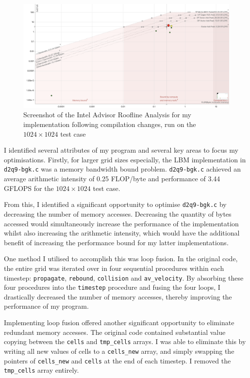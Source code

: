 \documentclass[twocolumn, a4paper]{article}
\begin{document}
\begin{figure}[htbp]
\includegraphics[width=\linewidth]{roofline_compiler.png}
\caption{Screenshot of the Intel Advisor Roofline Analysis for my implementation following compilation changes, run on the $1024\times1024$ test case}\label{fig:roofline_compiler}
\end{figure}

I identified several attributes of my program and several key areas to focus my optimisations.
Firstly, for larger grid sizes especially, the LBM implementation in \texttt{d2q9-bgk.c} was a memory bandwidth bound problem.
\texttt{d2q9-bgk.c} achieved an average arithmetic intensity of 0.25 FLOP/byte and performance of 3.44 GFLOPS for the $1024 \times 1024$ test case.

From this, I identified a significant opportunity to optimise \texttt{d2q9-bgk.c} by decreasing the number of memory accesses.
Decreasing the quantity of bytes accessed would simultaneously increase the performance of the implementation whilst also increasing the arithmetic intensity, which would have the additional benefit of increasing the performance bound for my latter implementations.

One method I utilised to accomplish this was loop fusion.
In the original code, the entire grid was iterated over in four sequential procedures within each timestep: \texttt{propagate}, \texttt{rebound}, \texttt{collision} and \texttt{av\_velocity}.
By absorbing these four procedures into the \texttt{timestep} procedure and fusing the four loops, I drastically decreased the number of memory accesses, thereby improving the performance of my program.

Implementing loop fusion offered another significant opportunity to eliminate redundant memory accesses.
The original code contained substantial value copying between the \texttt{cells} and \texttt{tmp\_cells} arrays.
I was able to eliminate this by writing all new values of cells to a \texttt{cells\_new} array, and simply swapping the pointers of \texttt{cells\_new} and \texttt{cells} at the end of each timestep.
I removed the \texttt{tmp\_cells} array entirely.
\end{document}
